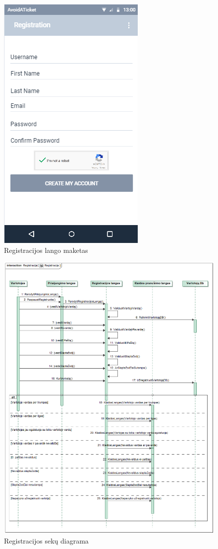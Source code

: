 \documentclass{VUMIFPSkursinis}
\begin{document}
	    \begin{figure}[H]
				\centering
				\includegraphics[scale=0.55]{img/mockup_registration}
				\caption{Registracijos lango maketas}
				\label{img:registracija}
			\end{figure}
		\begin{figure}[H]
				\centering
				\includegraphics[scale=0.55]{img/RegistracijaSequence}
				\caption{Registracijos sekų diagrama}
				\label{img:Registracijos sekų diagrama}
			\end{figure}
\end{document}
